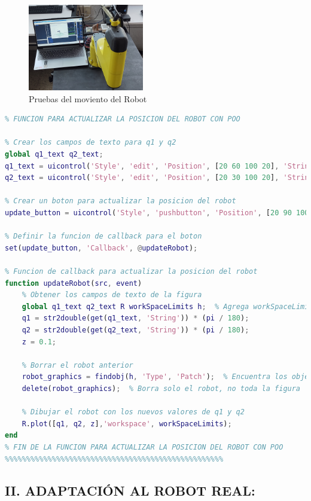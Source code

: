 \documentclass[final]{foresj}
\begin{document}
\begin{figure}[h!]
\centering
\includegraphics[width=0.45\textwidth]{SCARA2.jpg}
\caption{Pruebas del moviento del Robot}
\label{fig:my_label}
\end{figure}

\begin{lstlisting}[language=Matlab]
%%%%%%%%%%%%%%%%%%%%%%%%%%%%%%%%%%%%%%%%%%%%%%%%%%%
% FUNCION PARA ACTUALIZAR LA POSICION DEL ROBOT CON POO

% Crear los campos de texto para q1 y q2
global q1_text q2_text;
q1_text = uicontrol('Style', 'edit', 'Position', [20 60 100 20], 'String', '0');
q2_text = uicontrol('Style', 'edit', 'Position', [20 30 100 20], 'String', '0');

% Crear un boton para actualizar la posicion del robot
update_button = uicontrol('Style', 'pushbutton', 'Position', [20 90 100 20], 'String', 'Actualizar');

% Definir la funcion de callback para el boton
set(update_button, 'Callback', @updateRobot);

% Funcion de callback para actualizar la posicion del robot
function updateRobot(src, event)
    % Obtener los campos de texto de la figura
    global q1_text q2_text R workSpaceLimits h;  % Agrega workSpaceLimits y h a la lista de variables globales
    q1 = str2double(get(q1_text, 'String')) * (pi / 180);
    q2 = str2double(get(q2_text, 'String')) * (pi / 180);
    z = 0.1;

    % Borrar el robot anterior
    robot_graphics = findobj(h, 'Type', 'Patch');  % Encuentra los objetos graficos que representan al robot
    delete(robot_graphics);  % Borra solo el robot, no toda la figura

    % Dibujar el robot con los nuevos valores de q1 y q2
    R.plot([q1, q2, z],'workspace', workSpaceLimits);
end
% FIN DE LA FUNCION PARA ACTUALIZAR LA POSICION DEL ROBOT CON POO
%%%%%%%%%%%%%%%%%%%%%%%%%%%%%%%%%%%%%%%%%%%%%%%%%%%
\end{lstlisting}

\subsection{II. ADAPTACIÓN AL ROBOT REAL:}
\end{document}
